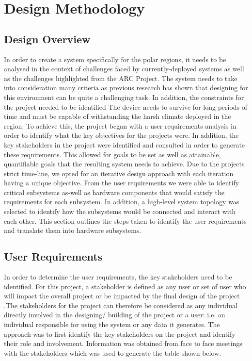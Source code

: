 
\chapter{Design Methodology}
\label{ch:ch3}
\section{Design Overview}
\label{sec:ch3_design}
In order to create a system specifically for the polar regions, it needs to be analysed in the context of challenges faced by currently-deployed systems as well as the challenges highlighted from the ARC Project. The system needs to take into consideration many criteria as previous research has shown that designing for this environment can be quite a challenging task. In addition, the constraints for the project needed to be identified The device needs to survive for long periods of time and must be capable of withstanding the harsh climate deployed in the region. To achieve this, the project began with a user requirements analysis in order to identify what the key objectives for the projects were. In addition, the key stakeholders in the project were identified and consulted in order to generate these requirements. This allowed for goals to be set as well as attainable, quantifiable goals that the resulting system needs to achieve. Due to the projects strict time-line, we opted for an iterative design approach with each iteration having a unique objective. From the user requirements we were able to identify critical subsystems as-well as hardware components that would satisfy the requirements for each subsystem. In addition, a high-level system topology was selected to identify how the subsystems would be connected and interact with each other. This section outlines the steps taken to identify the user requirements and translate them into hardware subsystems.

\section{User Requirements}
\label{sec:sec3_UR}
In order to determine the user requirements, the key stakeholders need to be identified. For this project, a stakeholder is defined as any user or set of user who will impact the overall project or be impacted by the final design of the project \cite{varvasovszky2000stakeholder}.The stakeholders for the project can therefore be considered as any individual directly involved in the designing/ building of the project or a user: i.e. an individual responsible for using the system or any data it generates. The approach was to first identify the key stakeholders on the project and identify their role and involvement. Information was obtained from face to face meetings with the stakeholders which was used to generate the table shown below.

